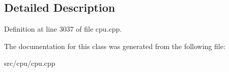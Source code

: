 \subsection{Detailed Description}


Definition at line 3037 of file cpu.\-cpp.



The documentation for this class was generated from the following file\-:\begin{DoxyCompactItemize}
\item 
src/cpu/cpu.\-cpp\end{DoxyCompactItemize}
